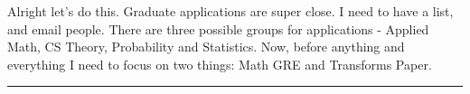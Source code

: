 \noindent {}

Alright let's do this. Graduate applications are super close. I need to have a list, and email people. There are three possible groups for applications - Applied Math, CS Theory, Probability and Statistics.  Now, before anything and everything I need to focus on two things: Math GRE and Transforms Paper.\\
\hrule
